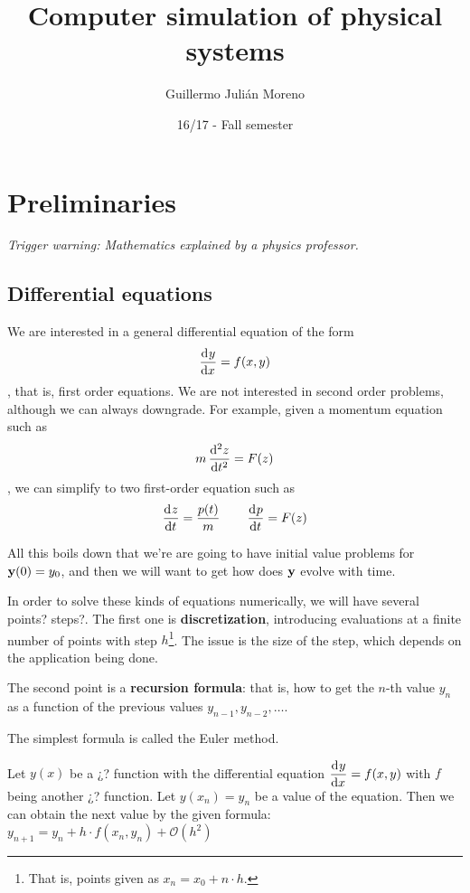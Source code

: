 \documentclass[palatino]{epflnotes}
\title{Computer simulation of physical systems}
\author{Guillermo Julián Moreno}
\date{16/17 - Fall semester}
\begin{document}
\frontmatter
\pagestyle{plain}
\maketitle

\tableofcontents
\mainmatter

\chapter{Preliminaries}

\textit{Trigger warning: Mathematics explained by a physics professor.}

\section{Differential equations}

We are interested in a general differential equation of the form \[ \od{y}{x} = f(x,y) \], that is, first order equations. We are not interested in second order problems, although we can always downgrade. For example, given a momentum equation such as \[ m \od[2]{z}{t} = F(z) \], we can simplify to two first-order equation such as \[ \od{z}{t} = \frac{p(t)}{m} \qquad \od{p}{t} = F(z) \]

All this boils down that we're are going to have initial value problems for $\mathbf{y}(0) = y_0$, and then we will want to get how does $\mathbf{y}$ evolve with time.

In order to solve these kinds of equations numerically, we will have several points? steps?. The first one is \textbf{discretization}, introducing evaluations at a finite number of points with step $h$\footnote{That is, points given as $x_n = x_0 + n·h$.}. The issue is the size of the step, which depends on the application being done.

The second point is a \textbf{recursion formula}: that is, how to get the $n$-th value $y_n$ as a function of the previous values $y_{n-1}, y_{n-2}, \dotsc$.

The simplest formula is called the Euler method.

\begin{prop} \label{prop:EulerMethod} Let $y(x)$ be a ¿? function with the differential equation $\iod{y}{x} = f(x,y)$ with $f$ being another ¿? function. Let $y(x_n) = y_n$ be a value of the equation. Then we can obtain the next value by the given formula: \( y_{n+1} = y_n + h · f(x_n, y_n) + \mathcal{O}(h^2) \)
\end{prop}
\end{document}

